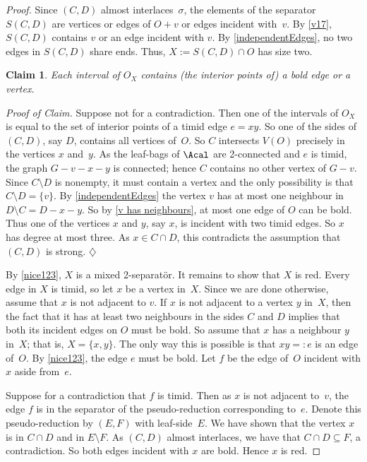 \documentclass{aic}
\newcommand{\se}{\subseteq}
\newenvironment{cproof}{\noindent\textit{Proof of Claim.}}{\phantom{!}\!\hfill$\diamondsuit$}
\theoremstyle{plain}
\newtheorem{sublem}{Claim}[thm]
\theoremstyle{definition}
\theoremstyle{plain}
\theoremstyle{plain}
\newcommand{\sm}{\setminus}
\begin{document}
\begin{proof}
Since $(C,D)$ almost interlaces~$\sigma$, the elements of the separator $S(C,D)$ are vertices or edges of $O+v$ or edges incident with~$v$. 
By \autoref{v17}, $S(C,D)$ contains $v$ or an edge incident with $v$.
By \autoref{independentEdges}, no two edges in $S(C,D)$ share ends.
Thus, $X:=S(C,D)\cap O$ has size two. 

\begin{sublem}\label{nice123}
    Each interval of $O_X$ contains (the interior points of) a bold edge or a vertex.
\end{sublem}

\begin{cproof}
Suppose not for a contradiction. 
Then one of the intervals of $O_X$ is equal to the set of interior points of a timid edge $e=xy$. 
So one of the sides of $(C,D)$, say $D$, contains all vertices of~$O$. 
So $C$ intersects $V(O)$ precisely in the vertices $x$ and~$y$. 
As the leaf-bags of $\Acal$ are 2-connected and $e$ is timid, the graph $G-v-x-y$ is connected; hence $C$ contains no other vertex of $G-v$. 
Since $C\sm D$ is nonempty, it must contain a vertex and the only possibility is that $C\sm D=\{v\}$. 
By \autoref{independentEdges} the vertex $v$ has at most one neighbour in $D\sm C= D-x-y$. 
So by \autoref{v has neighbours}, at most one edge of $O$ can be bold. 
Thus one of the vertices $x$ and $y$, say $x$, is incident with two timid edges. 
So $x$ has degree at most three. 
As $x\in C\cap D$, this contradicts the assumption that $(C,D)$ is strong. 
\end{cproof}\medskip

By \autoref{nice123}, $X$ is a mixed 2-separat{\"o}r. It remains to show that $X$ is red.
Every edge in  $X$ is timid, so let $x$ be a vertex in~$X$.
Since we are done otherwise, assume that $x$ is not adjacent to $v$.
If $x$ is not adjacent to a vertex $y$ in~$X$, then the fact that it has at least two neighbours in the sides $C$ and $D$ implies that both its incident edges on $O$ must be bold. 
So assume that $x$ has a neighbour $y$ in~$X$; that is, $X=\{x,y\}$. 
The only way this is possible is that $xy=:e$ is an edge of~$O$.
By \autoref{nice123}, the edge $e$ must be bold. Let $f$ be the edge of~$O$ incident with $x$ aside from~$e$. 

Suppose for a contradiction that $f$ is timid. Then as $x$ is not adjacent to~$v$, the edge $f$ is in the separator of the pseudo-reduction corresponding to~$e$. 
Denote this pseudo-reduction by $(E,F)$ with leaf-side~$E$. 
We have shown that the vertex $x$ is in $C\cap D$ and in $E\sm F$. 
As $(C,D)$ almost interlaces, we have that $C\cap D\se F$, a contradiction. 
So both edges incident with $x$ are bold. Hence $x$ is red. 
\end{proof}
\end{document}
